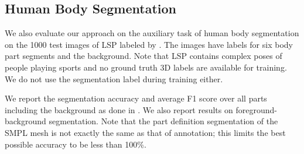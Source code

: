 \documentclass[10pt,twocolumn,letterpaper]{article}
\begin{document}
\begin{table}[]
\centering
{}
\caption{{\small {\bf Results on MPI-INF-3DHP with and without rigid alignment.} 
* are methods that output more than 3D joints. Accuracy increases with alignment (PCK and AUC increase, while MPJPE
decreases).}}
\label{tab:mpiinf3dhp}
\end{table}

\subsection{Human Body Segmentation}
We also evaluate our approach on the auxiliary task of human body segmentation on the
1000 test images of LSP \cite{LSP} labeled by \cite{UP}. 
The images have labels for six body part segments and the background.
Note that LSP contains complex poses of people playing sports and
no ground truth 3D labels are available for training. We do not use the segmentation label during training either. 

We report the segmentation accuracy and average F1 score over all parts
including the background as done in \cite{UP}. 
We also report results on foreground-background segmentation. 
Note that the part definition segmentation of the SMPL mesh is not exactly the same as that of
annotation; this limits the best possible accuracy to be less than 100\%.
\end{document}
